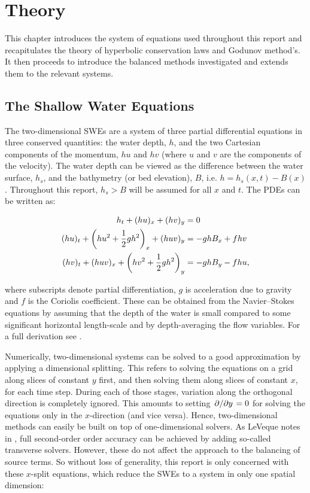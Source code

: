 \chapter{Theory}
\label{ch:theory}

This chapter introduces the system of equations used throughout this report and recapitulates the theory of hyperbolic conservation laws and Godunov method's. It then proceeds to introduce the balanced methods investigated and extends them to the relevant systems.

\section{The Shallow Water Equations}

The two-dimensional SWEs are a system of three partial differential equations in three conserved quantities: the water depth, $h$, and the two Cartesian components of the momentum, $hu$ and $hv$ (where $u$ and $v$ are the components of the velocity). The water depth can be viewed as the difference between the water surface, $h_s$, and the bathymetry (or bed elevation), $B$, i.e. $h = h_s(x,t) - B(x)$. Throughout this report, $h_s > B$ will be assumed for all $x$ and $t$. The PDEs can be written as:

\begin{subequations}
  \begin{align}
                            h_t + (hu)_x + (hv)_y & = 0 \\
    (hu)_t + \qty(hu^2 + \frac{1}{2}gh^2)_x + (huv)_y & = - ghB_x + fhv \\
    (hv)_t + (huv)_x + \qty(hv^2 + \frac{1}{2}gh^2)_y & = - ghB_y - fhu,
  \end{align}
\end{subequations}

where subscripts denote partial differentiation, $g$ is acceleration due to gravity and $f$ is the Coriolis coefficient. These can be obtained from the Navier--Stokes equations by assuming that the depth of the water is small compared to some significant horizontal length-scale and by depth-averaging the flow variables. For a full derivation see \cite{dellar2005shallow}.

Numerically, two-dimensional systems can be solved to a good approximation by applying a dimensional splitting. This refers to solving the equations on a grid along slices of constant $y$ first, and then solving them along slices of constant $x$, for each time step. During each of those stages, variation along the orthogonal direction is completely ignored. This amounts to setting $\pdv*{y} = 0$ for solving the equations only in the $x$-direction (and vice versa). Hence, two-dimensional methods can easily be built on top of one-dimensional solvers. As LeVeque notes in \cite{leveque1998balancing}, full second-order order accuracy can be achieved by adding so-called transverse solvers. However, these do not affect the approach to the balancing of source terms. So without loss of generality, this report is only concerned with these $x$-split equations, which reduce the SWEs to a system in only one spatial dimension:

